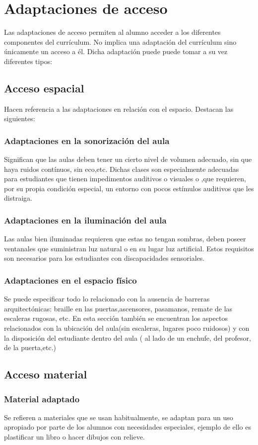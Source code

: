 \section{Adaptaciones de acceso}
Las adaptaciones de acceso permiten al alumno acceder a los diferentes componentes del currículum. No implica una adaptación del currículum sino únicamente un acceso a él. 
Dicha adaptación puede puede tomar a su vez diferentes tipos:

\subsection{Acceso espacial}
Hacen referencia a las adaptaciones en relación con el espacio. Destacan las siguientes:
\subsubsection{Adaptaciones en la sonorización del aula}
Significan que las aulas deben tener un cierto nivel de volumen adecuado, sin que haya ruidos contínuos, sin eco,etc. Dichas clases son especialmente adecuadas para estudiantes que tienen impedimentos auditivos o visuales o ,que requieren, por su propia condición especial, un entorno con pocos estímulos auditivos que les distraiga.
\subsubsection{Adaptaciones en la iluminación del aula}
Las aulas bien iluminadas requieren que estas no tengan sombras, deben poseer ventanales que suministran luz natural o en su lugar luz artificial. Estos requisitos son necesarios para los estudiantes con discapacidades sensoriales.
\subsubsection{Adaptaciones en el espacio físico}
Se puede especificar todo lo relacionado con la ausencia de barreras arquitectónicas:  braille en las puertas,ascensores, pasamanos, remate de las escaleras rugosas, etc. En esta sección también se encuentran los aspectos relacionados con la ubicación del aula(sin escaleras, lugares poco ruidosos) y con la disposición del estudiante dentro del aula ( al lado de un enchufe, del profesor, de la puerta,etc.)

\subsection{Acceso material}
\subsubsection{Material adaptado}
Se refieren a materiales que se usan habitualmente, se adaptan para un uso apropiado por parte de los alumnos con necesidades especiales, ejemplo de ello es plastificar un libro o hacer dibujos con relieve.
